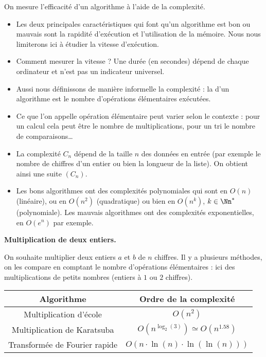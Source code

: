 \documentclass[11pt,class=report,crop=false]{standalone}
\begin{document}
\begin{cours}
On mesure l'efficacité d'un algorithme à l'aide de la complexité. 

\begin{itemize}
	\item Les deux principales caractéristiques qui font qu'un algorithme est bon ou mauvais sont la rapidité d'exécution et l'utilisation de la mémoire. Nous nous limiterons ici à étudier la vitesse d'exécution. 
	
	\item Comment mesurer la vitesse ? Une durée (en secondes) dépend de chaque ordinateur et n'est pas un indicateur universel. 
	
	\item Aussi nous définissons de manière informelle la complexité : la  d'un algorithme est le nombre d'opérations élémentaires exécutées.
	
	\item Ce que l'on appelle \og{}opération élémentaire\fg{} peut varier selon le contexte : pour un calcul cela peut être le nombre de multiplications, pour un tri le nombre de comparaisons\ldots
	
	\item La complexité $C_n$ dépend de la taille $n$ des données en entrée (par exemple le nombre de chiffres d'un entier ou bien la longueur de la liste). On obtient ainsi une suite $(C_n)$.
	
	\item Les bons algorithmes ont des complexités polynomiales qui sont en $O(n)$ (linéaire), ou en $O(n^2)$ (quadratique) ou bien en $O(n^k)$, $k\in\Nn^*$ (polynomiale). Les mauvais algorithmes ont des complexités exponentielles, en $O(e^n)$ par exemple.
\end{itemize}

\bigskip

\textbf{Multiplication de deux entiers.}

On souhaite multiplier deux entiers $a$ et $b$ de $n$ chiffres.
Il y a plusieurs méthodes, on les compare en comptant le nombre d'opérations élémentaires : ici des multiplications de petits nombres (entiers à $1$ ou $2$ chiffres).

\begin{center}
	\begin{tabular}{|c|c|}\hline
		Algorithme  & Ordre de la complexité \\ \hline\hline
		Multiplication d'école & $O(n^2)$ \\ \hline
		Multiplication de Karatsuba & $O(n^{\log_2(3)}) \simeq O(n^{1.58})$  \\ \hline
		Transformée de Fourier rapide & $O(n\cdot \ln(n) \cdot \ln(\ln(n)))$  \\\hline
	\end{tabular}
\end{center}  


\end{cours}
\end{document}
